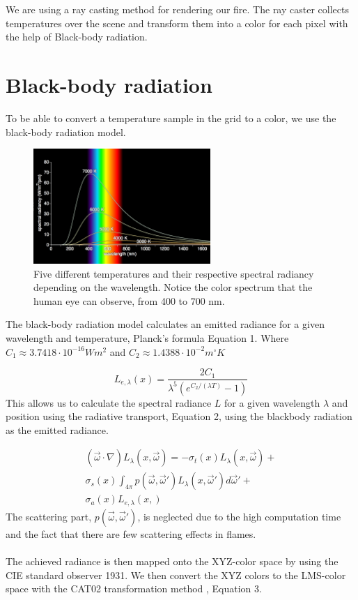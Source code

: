We are using a ray casting method for rendering our fire. The ray caster collects temperatures over the scene and transform them into a color for each pixel with the help of Black-body radiation.
\section{Black-body radiation}
	To be able to convert a temperature sample in the grid to a color, we use the black-body radiation model. 


\begin{figure}[h!]
\label{fig:blackbody}
\centering
\includegraphics[width=0.6\textwidth]{blackbody.png}
\caption{Five different temperatures and their respective spectral radiancy depending on the wavelength. Notice the color spectrum that the human eye can observe, from 400 to 700 nm.}
\end{figure}

The black-body radiation model calculates an emitted radiance for a given wavelength and temperature, Planck's formula\cite{Nguyen02} Equation 1. Where $C_1 \approx 3.7418 \cdot 10^{-16} Wm^2$ and $C_2 \approx 1.4388 \cdot 10^{-2} m^\circ K$

\begin{equation}
	L_{e,\lambda}(x) = \frac{2C_1}{\lambda^5(e^{C_2/(\lambda T)}-1)}
\end{equation}
This allows us to calculate the spectral radiance $L$ for a given wavelength $\lambda$ and position using the radiative transport, Equation 2, using the blackbody radiation as the emitted radiance. 

\begin{equation}
\begin{split}
	(\vec{\omega}\cdot \nabla)L_\lambda(x,\vec{\omega}) = -\sigma_t(x)L_\lambda(x,\vec{\omega}) + \\ 
\sigma_s(x) \int_{4\pi} p(\vec{\omega},\vec{\omega}')L_\lambda(x,\vec{\omega}')d\vec{\omega}' + \\
\sigma_a(x)L_{e,\lambda}(x,)
\end{split}
\end{equation}
The scattering part, $ p(\vec{\omega},\vec{\omega}')$,  is neglected due to the high computation time and the fact that there are few scattering effects in flames. \\\\
The achieved radiance is then mapped onto the XYZ-color space by using the CIE standard observer 1931\cite{CIE}.
We then convert the XYZ colors to the LMS-color space with the CAT02 transformation method \cite{CAT02}, Equation 3.

